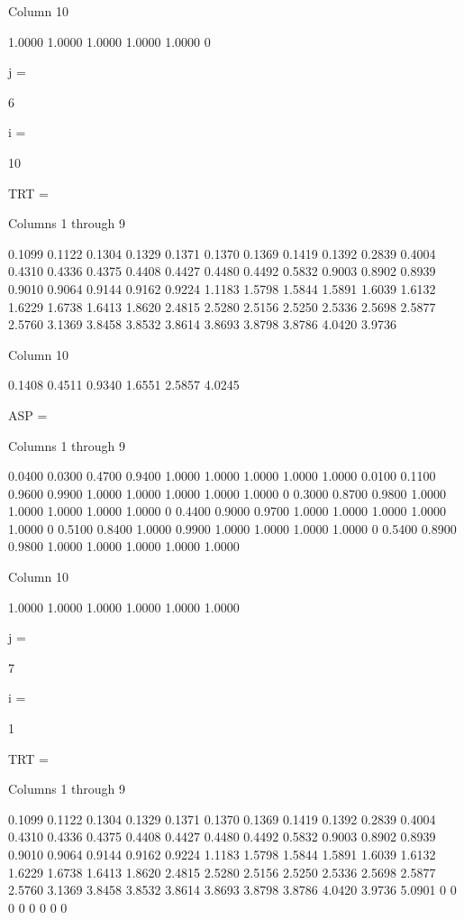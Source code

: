   Column 10

    1.0000
    1.0000
    1.0000
    1.0000
    1.0000
         0


j =

     6


i =

    10


TRT =

  Columns 1 through 9

    0.1099    0.1122    0.1304    0.1329    0.1371    0.1370    0.1369    0.1419    0.1392
    0.2839    0.4004    0.4310    0.4336    0.4375    0.4408    0.4427    0.4480    0.4492
    0.5832    0.9003    0.8902    0.8939    0.9010    0.9064    0.9144    0.9162    0.9224
    1.1183    1.5798    1.5844    1.5891    1.6039    1.6132    1.6229    1.6738    1.6413
    1.8620    2.4815    2.5280    2.5156    2.5250    2.5336    2.5698    2.5877    2.5760
    3.1369    3.8458    3.8532    3.8614    3.8693    3.8798    3.8786    4.0420    3.9736

  Column 10

    0.1408
    0.4511
    0.9340
    1.6551
    2.5857
    4.0245


ASP =

  Columns 1 through 9

    0.0400    0.0300    0.4700    0.9400    1.0000    1.0000    1.0000    1.0000    1.0000
    0.0100    0.1100    0.9600    0.9900    1.0000    1.0000    1.0000    1.0000    1.0000
         0    0.3000    0.8700    0.9800    1.0000    1.0000    1.0000    1.0000    1.0000
         0    0.4400    0.9000    0.9700    1.0000    1.0000    1.0000    1.0000    1.0000
         0    0.5100    0.8400    1.0000    0.9900    1.0000    1.0000    1.0000    1.0000
         0    0.5400    0.8900    0.9800    1.0000    1.0000    1.0000    1.0000    1.0000

  Column 10

    1.0000
    1.0000
    1.0000
    1.0000
    1.0000
    1.0000


j =

     7


i =

     1


TRT =

  Columns 1 through 9

    0.1099    0.1122    0.1304    0.1329    0.1371    0.1370    0.1369    0.1419    0.1392
    0.2839    0.4004    0.4310    0.4336    0.4375    0.4408    0.4427    0.4480    0.4492
    0.5832    0.9003    0.8902    0.8939    0.9010    0.9064    0.9144    0.9162    0.9224
    1.1183    1.5798    1.5844    1.5891    1.6039    1.6132    1.6229    1.6738    1.6413
    1.8620    2.4815    2.5280    2.5156    2.5250    2.5336    2.5698    2.5877    2.5760
    3.1369    3.8458    3.8532    3.8614    3.8693    3.8798    3.8786    4.0420    3.9736
    5.0901         0         0         0         0         0         0         0         0

